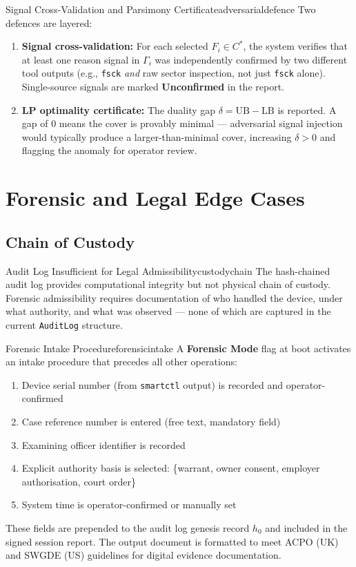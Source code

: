 \documentclass[11pt,a4paper]{report}
\begin{document}
\begin{solution}{Signal Cross-Validation and Parsimony Certificate}{adversarialdefence}
Two defences are layered:
\begin{enumerate}[noitemsep]
  \item \textbf{Signal cross-validation:} For each selected $F_i \in C^*$, the system verifies that at least one reason signal in $\Gamma_i$ was independently confirmed by two different tool outputs (e.g., \texttt{fsck} \emph{and} raw sector inspection, not just \texttt{fsck} alone). Single-source signals are marked \textbf{Unconfirmed} in the report.
  \item \textbf{LP optimality certificate:} The duality gap $\delta = \mathrm{UB} - \mathrm{LB}$ is reported. A gap of 0 means the cover is provably minimal --- adversarial signal injection would typically produce a larger-than-minimal cover, increasing $\delta > 0$ and flagging the anomaly for operator review.
\end{enumerate}
\end{solution}

\chapter{Forensic and Legal Edge Cases}

\section{Chain of Custody}

\begin{edgecase}{Audit Log Insufficient for Legal Admissibility}{custodychain}
The hash-chained audit log provides computational integrity but not physical chain of custody. Forensic admissibility requires documentation of who handled the device, under what authority, and what was observed --- none of which are captured in the current \texttt{AuditLog} structure.
\end{edgecase}

\begin{solution}{Forensic Intake Procedure}{forensicintake}
A \textbf{Forensic Mode} flag at boot activates an intake procedure that precedes all other operations:
\begin{enumerate}[noitemsep]
  \item Device serial number (from \texttt{smartctl} output) is recorded and operator-confirmed
  \item Case reference number is entered (free text, mandatory field)
  \item Examining officer identifier is recorded
  \item Explicit authority basis is selected: \{warrant, owner consent, employer authorisation, court order\}
  \item System time is operator-confirmed or manually set
\end{enumerate}
These fields are prepended to the audit log genesis record $h_0$ and included in the signed session report. The output document is formatted to meet ACPO (UK) and SWGDE (US) guidelines for digital evidence documentation.
\end{solution}
\end{document}
